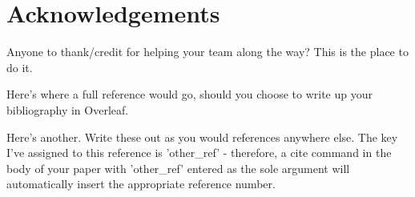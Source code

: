 \documentclass[10pt,twocolumn,letterpaper]{article}
\begin{document}
\section*{Acknowledgements}
Anyone to thank/credit for helping your team along the way? This is the place to do it.

\begin{thebibliography}{9}
 Here's where a full reference would go, should you choose to write up your bibliography in Overleaf.

 Here's another. Write these out as you would references anywhere else. The key I've assigned to this reference is 'other\_ref' - therefore, a cite command in the body of your paper with 'other\_ref' entered as the sole argument will automatically insert the appropriate reference number.
\end{thebibliography}
\end{document}

